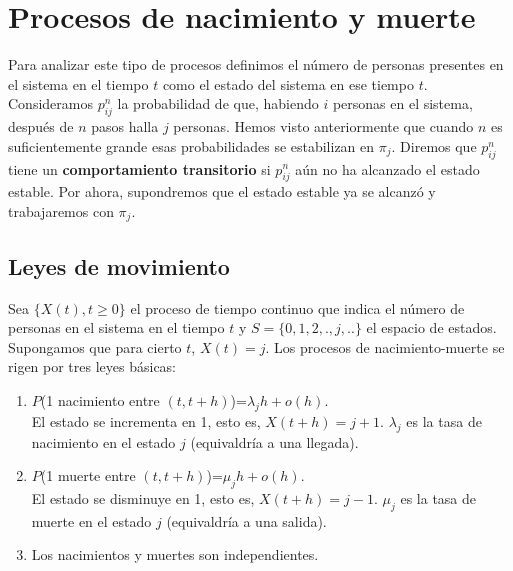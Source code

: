 

\section{Procesos de nacimiento y muerte}

Para analizar este tipo de procesos definimos el número de personas presentes en el sistema en el tiempo $t$ como el estado del sistema en ese tiempo $t$. Consideramos $p_{ij}^n$ la probabilidad de que, habiendo $i$ personas en el sistema, después de $n$ pasos halla $j$ personas. Hemos visto anteriormente que cuando $n$ es suficientemente grande esas probabilidades se estabilizan en $\pi_j$. Diremos que $p_{ij}^n$ tiene un \textbf{comportamiento transitorio} si $p_{ij}^n$ aún no ha alcanzado el estado estable. Por ahora, supondremos que el estado estable ya se alcanzó y trabajaremos con $\pi_j$.

\subsection{Leyes de movimiento}

Sea $\lbrace X(t), t\geq 0 \rbrace$ el proceso de tiempo continuo que indica el número de personas en el sistema en el tiempo $t$ y $S=\lbrace 0,1,2,.,j,..\rbrace$ el espacio de estados. Supongamos que para cierto $t$, $X(t)=j$. Los procesos de nacimiento-muerte se rigen por tres leyes básicas:

\begin{enumerate}
	
	\item $P$(1 nacimiento entre $(t, t+h)$)=$\lambda_j h +o(h)$.\\
	El estado se incrementa en 1, esto es, $X(t+h)=j+1$.
	$\lambda_j$ es la tasa de nacimiento en el estado $j$ (equivaldría a una llegada).
	
	\item $P$(1 muerte entre $(t, t+h)$)=$\mu_j h +o(h)$.\\
	El estado se disminuye en 1, esto es, $X(t+h)=j-1$.
	$\mu_j$ es la tasa de muerte en el estado $j$ (equivaldría a una salida).
	
	\item Los nacimientos y muertes son independientes.
	
	
\end{enumerate} 

